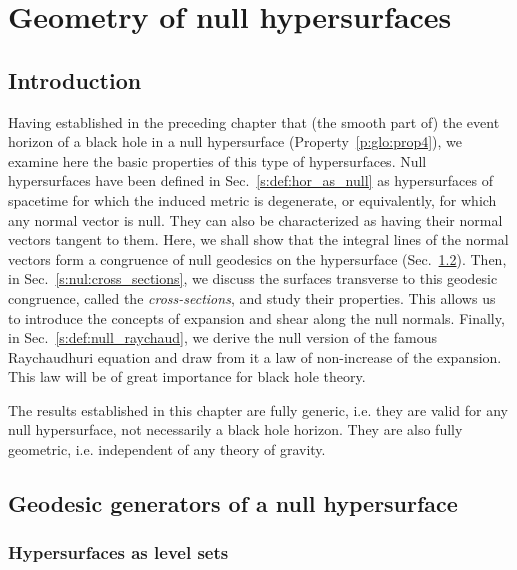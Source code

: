 \chapter{Geometry of null hypersurfaces}
\label{s:def}

\minitoc

\section{Introduction}

Having established in the preceding chapter that (the smooth part of) the event horizon of
a black hole in a null hypersurface (Property~\ref{p:glo:prop4}),
we examine here the basic properties of this type of hypersurfaces.
Null hypersurfaces have been defined in Sec.~\ref{s:def:hor_as_null}
as hypersurfaces of spacetime
for which the induced metric is degenerate, or equivalently, for which
any normal vector is null. They can also be characterized as having their normal
vectors tangent to them. Here, we shall show that the integral lines
of the normal vectors form a congruence of null geodesics on the hypersurface
(Sec.~\ref{s:def:geom_null_hypsurf}). Then, in Sec.~\ref{s:nul:cross_sections}, we discuss the
surfaces transverse to this geodesic congruence, called the
\emph{cross-sections}, and study their
properties. This allows us
to introduce the concepts of expansion and shear along the null normals.
Finally, in Sec.~\ref{s:def:null_raychaud},
we derive the null version of the famous Raychaudhuri equation
and draw from it a law of non-increase of the expansion.
This law will be of great importance for black hole theory.

The results established in this chapter are fully generic, i.e. they are valid for any
null hypersurface, not necessarily a black hole horizon. They are also fully
geometric, i.e. independent of any theory of gravity.


\section{Geodesic generators of a null hypersurface} \label{s:def:geom_null_hypsurf}

\subsection{Hypersurfaces as level sets} \label{s:def:hypsurf_level}

